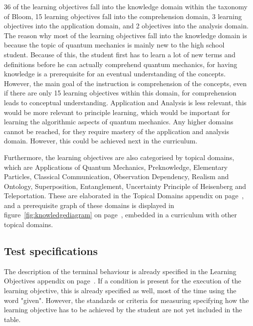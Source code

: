 \documentclass[11pt,twoside]{report} %
\begin{document}
36 of the learning objectives fall into the knowledge domain within the taxonomy of Bloom, 15 learning objectives fall into the comprehension domain, 3 learning objectives into the application domain, and 2 objectives into the analysis domain. The reason why most of the learning objectives fall into the knowledge domain is because the topic of quantum mechanics is mainly new to the high school student. Because of this, the student first has to learn a lot of new terms and definitions before he can actually comprehend quantum mechanics, for having knowledge is a prerequisite for an eventual understanding of the concepts. However, the main goal of the instruction is comprehension of the concepts, even if there are only 15 learning objectives within this domain, for comprehension leads to conceptual understanding. Application and Analysis is less relevant, this would be more relevant to principle learning, which would be important for learning the algorithmic aspects of quantum mechanics. Any higher domains cannot be reached, for they require mastery of the application and analysis domain. However, this could be achieved next in the curriculum.

Furthermore, the learning objectives are also categorised by topical domains, which are Applications of Quantum Mechanics, Preknowledge, Elementary Particles, Classical Communication, Observation Dependency, Realism and Ontology, Superposition, Entanglement, Uncertainty Principle of Heisenberg and Teleportation. These are elaborated in the Topical Domains appendix on page~\pageref{app:topicaldomains}, and a prerequisite graph of these domains is displayed in figure~\ref{fig:knowledgediagram} on page~\pageref{fig:knowledgediagram}, embedded in a curriculum with other topical domains.

\subsection{Test specifications}
\label{subch:testspecifications}

The description of the terminal behaviour is already specified in the Learning Objectives appendix on page~\pageref{app:learningobjectives}. If a condition is present for the execution of the learning objective, this is already specified as well, most of the time using the word "given". However, the standards or criteria for measuring specifying how the learning objective has to be achieved by the student are not yet included in the table.
\end{document}
